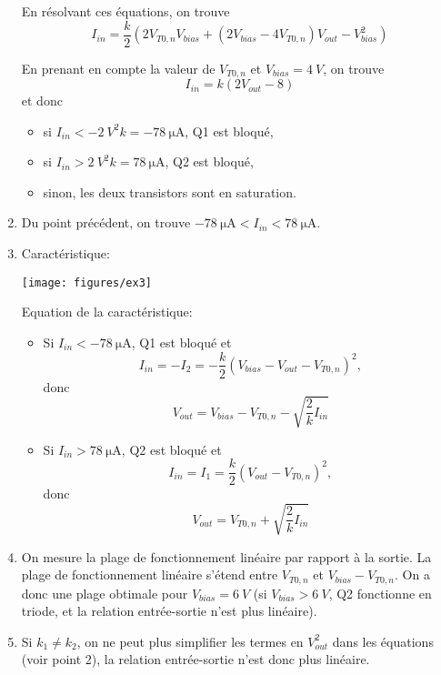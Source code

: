 \begin{enumerate}
	En résolvant ces équations, on trouve
	\[I_{in} = \frac{k}{2}\left(2 V_{T0,n} V_{bias} + (2 V_{bias} - 4 V_{T0,n}) V_{out} - V_{bias}
	^2\right)\]

	En prenant en compte la valeur de $V_{T0,n}$ et $V_{bias} = \SI{4}{V}$, on trouve
	\[I_{in} = k\left(2 V_{out} - 8\right)\]
	et donc
	\begin{itemize}
		\item si $I_{in} < -\SI{2}{V^2}k = -\SI{78}{\micro\ampere}$, Q1 est bloqué,
		\item si $I_{in} > \SI{2}{V^2}k = \SI{78}{\micro\ampere}$, Q2 est bloqué,
		\item sinon, les deux transistors sont en saturation.
	\end{itemize}

	\item Du point précédent, on trouve $-\SI{78}{\micro\ampere} < I_{in} < \SI{78}{\micro\ampere}$.

	\item Caractéristique:
	\begin{center}
		\texttt{[image: figures/ex3]}
	\end{center}

	Equation de la caractéristique:
	\begin{itemize}
    	\item Si $I_{in} < \SI{-78}{\micro\ampere}$, Q1 est bloqué et
        \[I_{in} = - I_2 = -\frac{k}{2}\left(V_{bias} - V_{out} - V_{T0,n}\right)^2,\]
        donc \[V_{out} = V_{bias} - V_{T0,n} - \sqrt{\frac{2}{k}I_{in}}\]
    	\item Si $I_{in} > \SI{78}{\micro\ampere}$, Q2 est bloqué et
        \[I_{in} = I_1 = \frac{k}{2}\left(V_{out} - V_{T0,n}\right)^2,\]
        donc \[V_{out} = V_{T0,n} + \sqrt{\frac{2}{k}I_{in}}\]
	\end{itemize}
	
	\item On mesure la plage de fonctionnement linéaire par rapport à la sortie. La plage de
	fonctionnement linéaire s'étend entre $V_{T0,n}$ et $V_{bias} - V_{T0,n}$. On a donc une plage
	obtimale pour $V_{bias} = \SI{6}{V}$ (si $V_{bias} > \SI{6}{V}$, Q2 fonctionne en triode, et la
	relation entrée-sortie n'est plus linéaire).

	\item Si $k_1 \neq k_2$, on ne peut plus simplifier les termes en $V_{out}^2$ dans les équations
	(voir point 2), la relation entrée-sortie n'est donc plus linéaire.
\end{enumerate}



